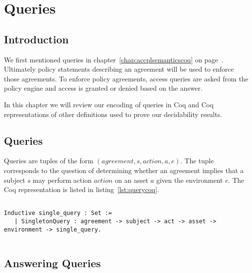 \chapter{Queries}\label{chap:queries}


\section{Introduction}


We first mentioned queries in chapter~\ref{chap:accplsemanticscoq} on page~\pageref{chap:accplsemanticscoq}. Ultimately policy statements describing an agreement will be used to enforce those agreements. To enforce policy agreements, access queries are asked from the policy engine and access is granted or denied based on the answer.

In this chapter we will review our encoding of queries in Coq and Coq representations of other definitions used to prove our decidability results.


\section{Queries}

Queries are tuples of the form $(agreement, s, action, a, e)$. The tuple corresponds to the question of determining whether an agreement implies that a subject $s$ may perform action $action$ on an asset $a$ given the environment $e$. The Coq representation is listed in listing~\ref{lst:querycoq}. 

\begin{minipage}[c]{0.95\textwidth}
\begin{lstlisting}

Inductive single_query : Set := 
   | SingletonQuery : agreement -> subject -> act -> asset -> environment -> single_query.
   
\end{lstlisting}
\end{minipage}

\section{Answering Queries}\label{sec:answerqueriesodrl}

